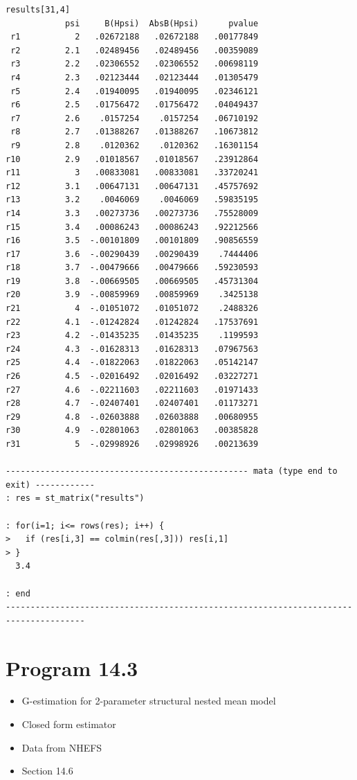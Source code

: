\documentclass[
  10pt,
  a4paper,
]{book}
\providecommand{\tightlist}{%
  \setlength{\itemsep}{0pt}\setlength{\parskip}{0pt}}
\begin{document}
\begin{verbatim}
results[31,4]
            psi     B(Hpsi)  AbsB(Hpsi)      pvalue
 r1           2   .02672188   .02672188   .00177849
 r2         2.1   .02489456   .02489456   .00359089
 r3         2.2   .02306552   .02306552   .00698119
 r4         2.3   .02123444   .02123444   .01305479
 r5         2.4   .01940095   .01940095   .02346121
 r6         2.5   .01756472   .01756472   .04049437
 r7         2.6    .0157254    .0157254   .06710192
 r8         2.7   .01388267   .01388267   .10673812
 r9         2.8    .0120362    .0120362   .16301154
r10         2.9   .01018567   .01018567   .23912864
r11           3   .00833081   .00833081   .33720241
r12         3.1   .00647131   .00647131   .45757692
r13         3.2    .0046069    .0046069   .59835195
r14         3.3   .00273736   .00273736   .75528009
r15         3.4   .00086243   .00086243   .92212566
r16         3.5  -.00101809   .00101809   .90856559
r17         3.6  -.00290439   .00290439    .7444406
r18         3.7  -.00479666   .00479666   .59230593
r19         3.8  -.00669505   .00669505   .45731304
r20         3.9  -.00859969   .00859969    .3425138
r21           4  -.01051072   .01051072    .2488326
r22         4.1  -.01242824   .01242824   .17537691
r23         4.2  -.01435235   .01435235    .1199593
r24         4.3  -.01628313   .01628313   .07967563
r25         4.4  -.01822063   .01822063   .05142147
r26         4.5  -.02016492   .02016492   .03227271
r27         4.6  -.02211603   .02211603   .01971433
r28         4.7  -.02407401   .02407401   .01173271
r29         4.8  -.02603888   .02603888   .00680955
r30         4.9  -.02801063   .02801063   .00385828
r31           5  -.02998926   .02998926   .00213639

------------------------------------------------- mata (type end to exit) ------------
: res = st_matrix("results")

: for(i=1; i<= rows(res); i++) { 
>   if (res[i,3] == colmin(res[,3])) res[i,1]
> }
  3.4

: end
--------------------------------------------------------------------------------------
\end{verbatim}

\hypertarget{program-14.3-1}{%
\section{Program 14.3}\label{program-14.3-1}}

\begin{itemize}
\tightlist
\item
  G-estimation for 2-parameter structural nested mean model
\item
  Closed form estimator
\item
  Data from NHEFS
\item
  Section 14.6
\end{itemize}
\end{document}
